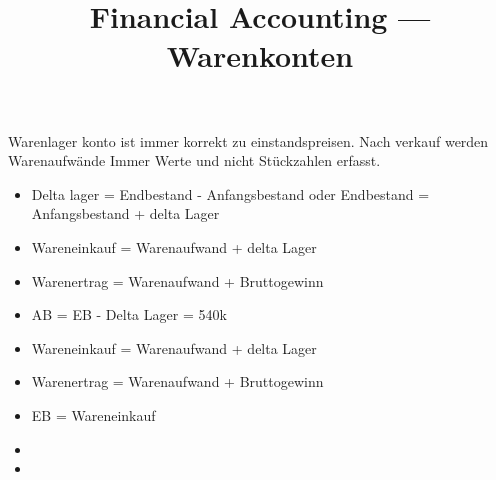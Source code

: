 \documentclass[a4paper]{article}
\title{\textbf{Financial Accounting — Warenkonten}}
\begin{document}
    \maketitle
    Warenlager konto ist immer korrekt zu einstandspreisen. Nach verkauf werden Warenaufwände
    Immer Werte und nicht Stückzahlen erfasst.

    \begin{itemize}
        \item  Delta lager = Endbestand - Anfangsbestand oder Endbestand = Anfangsbestand + delta Lager
        \item Wareneinkauf = Warenaufwand + delta Lager
        \item Warenertrag = Warenaufwand + Bruttogewinn
    \end{itemize}
  \begin{itemize}
      \item AB = EB - Delta Lager = 540k
      \item Wareneinkauf = Warenaufwand + delta Lager
      \item Warenertrag = Warenaufwand + Bruttogewinn
  \end{itemize}
\begin{itemize}
      \item EB = Wareneinkauf 
      \item 
      \item 
  \end{itemize}
    
\end{document}

